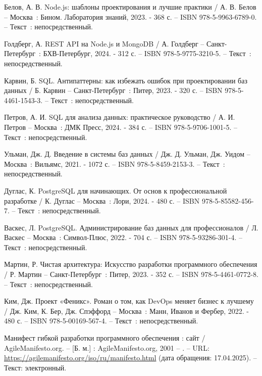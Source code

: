 \begin{thebibliography}{99}
	 Белов, А. В. Node.js: шаблоны проектирования и лучшие практики / А. В. Белов – Москва~: Бином. Лаборатория знаний, 2023. - 368 с. – ISBN 978-5-9963-6789-0. – Текст~: непосредственный.
	
	 Голдберг, А. REST API на Node.js и MongoDB / А. Голдберг – Санкт-Петербург~: БХВ-Петербург, 2024. - 312 с. – ISBN 978-5-9775-3210-5. – Текст~: непосредственный.
	
	 Карвин, Б. SQL. Антипаттерны: как избежать ошибок при проектировании баз данных / Б. Карвин – Санкт-Петербург~: Питер, 2023. - 320 с. – ISBN 978-5-4461-1543-3. – Текст~: непосредственный.
	
	 Петров, А. И. SQL для анализа данных: практическое руководство / А. И. Петров – Москва~: ДМК Пресс, 2024. - 384 с. – ISBN 978-5-9706-1001-5. – Текст~: непосредственный.
	
	 Ульман, Дж. Д. Введение в системы баз данных / Дж. Д. Ульман, Дж. Уидом – Москва~: Вильямс, 2021. - 1072 с. – ISBN 978-5-8459-2153-3. – Текст~: непосредственный.
	
	 Дуглас, К. PostgreSQL для начинающих. От основ к профессиональной разработке / К. Дуглас – Москва~: Лори, 2024. - 480 с. – ISBN 978-5-85582-456-7. – Текст~: непосредственный.
	
	 Васкес, Л. PostgreSQL. Администрирование баз данных для профессионалов / Л. Васкес – Москва~: Символ-Плюс, 2022. - 704 с. – ISBN 978-5-93286-301-4. – Текст~: непосредственный.
	
	 Мартин, Р. Чистая архитектура: Искусство разработки программного обеспечения / Р. Мартин – Санкт-Петербург~: Питер, 2023. - 352 с. – ISBN 978-5-4461-0772-8. – Текст~: непосредственный.
	
	 Ким, Дж. Проект «Феникс». Роман о том, как DevOps меняет бизнес к лучшему / Дж. Ким, К. Бер, Дж. Спэффорд – Москва~: Манн, Иванов и Фербер, 2022. - 480 с. – ISBN 978-5-00169-567-4. – Текст~: непосредственный.
	
	 Манифест гибкой разработки программного обеспечения : сайт / AgileManifesto.org. – [Б. м.] : AgileManifesto.org, 2001 – . – URL: \url{https://agilemanifesto.org/iso/ru/manifesto.html} (дата обращения: 17.04.2025). – Текст: электронный.
	

\end{thebibliography}
